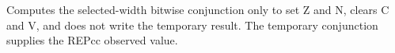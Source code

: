 Computes the selected-width bitwise conjunction only to set Z and N, clears C and V, and does not write the temporary result. The temporary conjunction supplies the REPcc observed value.
